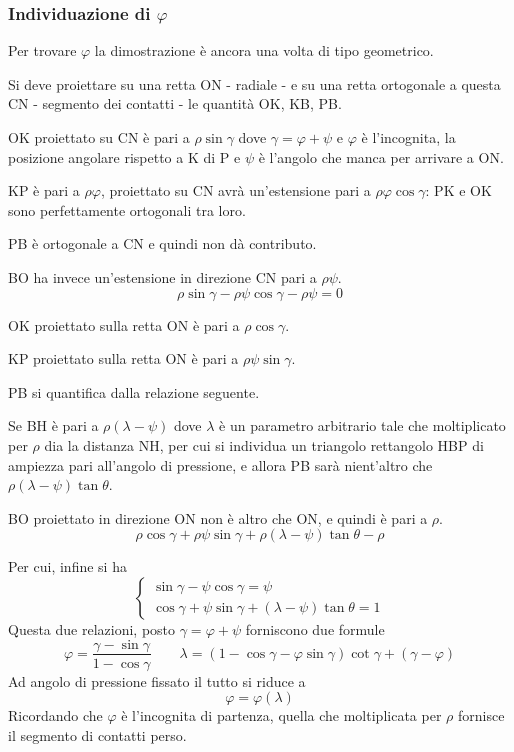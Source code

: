 \documentclass[a4paper, 15pt]{article}
\begin{document}
		\subsubsection{Individuazione di $\varphi$}
\begin{adjustwidth}{2in}{} 
		Per trovare $\varphi$  la dimostrazione è ancora una volta di tipo geometrico. 
		
		Si deve proiettare su una retta ON - radiale - e su una retta ortogonale a questa CN  - segmento dei contatti - le quantità OK, KB, PB. \newline 
		
		OK proiettato su CN è pari a $\rho\sin\gamma$ dove $\gamma = \varphi + \psi$ e $\varphi$ è l'incognita, la posizione angolare rispetto a K di P e $\psi$ è l'angolo che manca per arrivare a ON. 
		
		KP è pari a $\rho\varphi$, proiettato su CN avrà un'estensione pari a $\rho\varphi\cos\gamma$: PK e OK sono perfettamente ortogonali tra loro.  
		
		PB è ortogonale a CN e quindi non dà contributo. 
		
		BO ha invece un'estensione in direzione CN pari a $\rho\psi$.
		\[\rho\sin\gamma - \rho\psi\cos\gamma - \rho\psi = 0\]
		
		OK proiettato sulla retta ON è pari a $\rho\cos\gamma$. 
		
		KP proiettato sulla retta ON è pari a $\rho\psi\sin\gamma$. 
		
		PB si quantifica dalla relazione seguente. 
		
		Se BH è pari a  $\rho(\lambda-\psi)$ dove $\lambda$ è un parametro arbitrario tale che moltiplicato per $\rho$ dia la distanza NH, per cui si individua un triangolo rettangolo HBP di ampiezza pari all'angolo di pressione, e allora PB sarà nient'altro che $\rho(\lambda-\psi)\tan\theta$. 
		
		BO proiettato in direzione ON non è altro che ON, e quindi è pari a $\rho$.
		\[\rho\cos\gamma + \rho\psi\sin\gamma +  \rho(\lambda-\psi)\tan\theta - \rho\]
		
		Per cui, infine si ha		
		\[\begin{cases}
			\sin\gamma - \psi\cos\gamma = \psi \\
			\cos\gamma + \psi\sin\gamma +  (\lambda-\psi)\tan\theta = 1
		\end{cases}\]
		Questa due relazioni, posto $\gamma = \varphi + \psi$ forniscono due formule
		\[\varphi = \dfrac{\gamma - \sin\gamma}{1-\cos\gamma} \qquad \lambda = (1-\cos\gamma-\varphi\sin\gamma)\cot\gamma + (\gamma-\varphi)\]
		Ad angolo di pressione fissato il tutto si riduce a 
		\[\varphi = \varphi(\lambda)\]
		Ricordando che $\varphi$ è l'incognita di partenza, quella che moltiplicata per $\rho$ fornisce il segmento di contatti perso. 
		

\end{adjustwidth}
\end{document}
